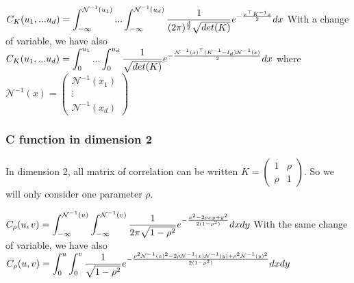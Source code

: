 \documentclass{article}
\begin{document}
	\begin{math}
	 C_{K}(u_{1},...u_{d})= \mathlarger{ \int_{-\infty}^{\mathcal{N}^{-1}(u_{1})}...\int_{-\infty}^{\mathcal{N}^{-1}(u_{d})} \frac{1}{(2\pi)^{\frac{d}{2}}\sqrt{det(K)}}e^{-\frac{x^\top K^{-1} x}{2}}dx}
	\end{math}
	\newline
	\newline
	With a change of variable, we have also \newline
	\newline
	\begin{math}
	C_{K}(u_{1},...u_{d})=  \mathlarger{ \int_{0}^{u_{1}}...\int_{0}^{u_{d}} \frac{1}{\sqrt{det(K)}}e^{-\frac{\mathcal{N}^{-1}(x)^\top (K^{-1}-I_{d}) \mathcal{N}^{-1}(x)}{2}}dx}
	\end{math}
	\newline
	\newline
	\newline
	where \begin{math} \mathcal{N}^{-1}(x) =  \begin{pmatrix}
   \mathcal{N}^{-1}(x_{1}) \\
  \vdots   \\
   \mathcal{N}^{-1}(x_{d})
 \end{pmatrix}\end{math}

\subsubsection{C function in dimension 2}

 	In dimension 2, all matrix of correlation can be written \begin{math} K =
 \begin{pmatrix}
  1 & \rho \\
  \rho & 1
 \end{pmatrix}
\end{math}. So we will only consider one parameter \begin{math} \rho \end{math}.\newline
\newline

\begin{math}
	C_{\rho} (u,v) = \mathlarger{\int_{-\infty}^{\mathcal{N}^{-1}(u)}\int_{-\infty}^{\mathcal{N}^{-1}(v)} \frac{1}{2\pi\sqrt{1-\rho^{2}}}e^{-\frac{x^2-2\rho x y +y^{2}}{2(1-\rho^{2})} }dx dy}
\end{math}
\newline
\newline
With the same change of variable, we have also
\newline
\begin{math}
	C_{\rho} (u,v) = \mathlarger{\int_{0}^{u}\int_{0}^{v} \frac{1}{\sqrt{1-\rho^{2}}}e^{-\frac{\rho^{2}\mathcal{N}^{-1}(x)^2-2\rho\mathcal{N}^{-1}(x)\mathcal{N}^{-1}(y) + \rho^{2} \mathcal{N}^{-1}(y)^{2}}{2(1-\rho^{2})} }dx dy}
\end{math}
\end{document}
